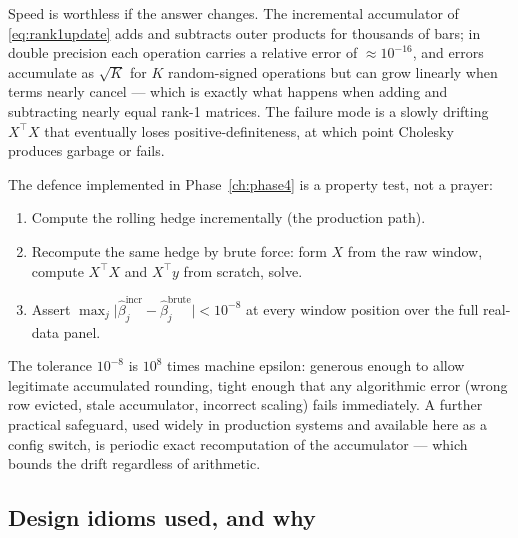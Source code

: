 Speed is worthless if the answer changes. The incremental accumulator of
\eqref{eq:rank1update} adds and subtracts outer products for thousands of bars; in double
precision each operation carries a relative error of $\approx10^{-16}$, and errors
accumulate as $\sqrt{K}$ for $K$ random-signed operations but can grow linearly when
terms nearly cancel --- which is exactly what happens when adding and subtracting nearly
equal rank-1 matrices. The failure mode is a slowly drifting $X^{\top}X$ that eventually
loses positive-definiteness, at which point Cholesky produces garbage or fails.

The defence implemented in Phase~\ref{ch:phase4} is a property test, not a prayer:
\begin{enumerate}
  \item Compute the rolling hedge incrementally (the production path).
  \item Recompute the same hedge by brute force: form $X$ from the raw window, compute
    $X^{\top}X$ and $X^{\top}y$ from scratch, solve.
  \item Assert $\max_j\lvert\hat\beta^{\text{incr}}_j-\hat\beta^{\text{brute}}_j\rvert
    < 10^{-8}$ at every window position over the full real-data panel.
\end{enumerate}
The tolerance $10^{-8}$ is $10^{8}$ times machine epsilon: generous enough to allow
legitimate accumulated rounding, tight enough that any algorithmic error (wrong row
evicted, stale accumulator, incorrect scaling) fails immediately. A further practical
safeguard, used widely in production systems and available here as a config switch, is
periodic exact recomputation of the accumulator --- which bounds the drift regardless of
arithmetic.

\subsection{Design idioms used, and why}
\label{sec:sys:idioms}

